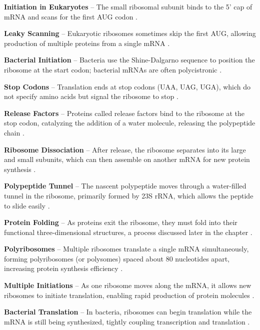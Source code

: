 \textbf{Initiation in Eukaryotes} – The small ribosomal subunit binds to the 5' cap of mRNA and scans for the first AUG codon \cite*{L1-Chapter6}.

\textbf{Leaky Scanning} – Eukaryotic ribosomes sometimes skip the first AUG, allowing production of multiple proteins from a single mRNA \cite*{L1-Chapter6}.

\textbf{Bacterial Initiation} – Bacteria use the Shine-Dalgarno sequence to position the ribosome at the start codon; bacterial mRNAs are often polycistronic \cite*{L1-Chapter6}.



\textbf{Stop Codons} – Translation ends at stop codons (UAA, UAG, UGA), which do not specify amino acids but signal the ribosome to stop \cite*{L1-Chapter6}.

\textbf{Release Factors} – Proteins called release factors bind to the ribosome at the stop codon, catalyzing the addition of a water molecule, releasing the polypeptide chain \cite*{L1-Chapter6}.

\textbf{Ribosome Dissociation} – After release, the ribosome separates into its large and small subunits, which can then assemble on another mRNA for new protein synthesis \cite*{L1-Chapter6}.

\textbf{Polypeptide Tunnel} – The nascent polypeptide moves through a water-filled tunnel in the ribosome, primarily formed by 23S rRNA, which allows the peptide to slide easily \cite*{L1-Chapter6}.

\textbf{Protein Folding} – As proteins exit the ribosome, they must fold into their functional three-dimensional structures, a process discussed later in the chapter \cite*{L1-Chapter6}.




\textbf{Polyribosomes} – Multiple ribosomes translate a single mRNA simultaneously, forming polyribosomes (or polysomes) spaced about 80 nucleotides apart, increasing protein synthesis efficiency \cite*{L1-Chapter6}.

\textbf{Multiple Initiations} – As one ribosome moves along the mRNA, it allows new ribosomes to initiate translation, enabling rapid production of protein molecules \cite*{L1-Chapter6}.

\textbf{Bacterial Translation} – In bacteria, ribosomes can begin translation while the mRNA is still being synthesized, tightly coupling transcription and translation \cite*{L1-Chapter6}.

